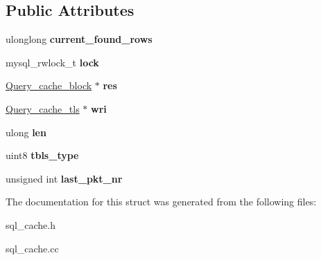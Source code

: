 \subsection*{Public Attributes}
\begin{DoxyCompactItemize}
\item 
\mbox{\label{structQuery__cache__query_a6c683aedb3d1381365d69536689df147}} 
ulonglong {\bfseries current\+\_\+found\+\_\+rows}
\item 
\mbox{\label{structQuery__cache__query_a3b948da400a4e29da917a181747aee06}} 
mysql\+\_\+rwlock\+\_\+t {\bfseries lock}
\item 
\mbox{\label{structQuery__cache__query_a5f3f0884f89ff6b51d9193da473d1cab}} 
\mbox{\hyperlink{structQuery__cache__block}{Query\+\_\+cache\+\_\+block}} $\ast$ {\bfseries res}
\item 
\mbox{\label{structQuery__cache__query_a6f10a18b737c62f1c6799cf8f34adca9}} 
\mbox{\hyperlink{structQuery__cache__tls}{Query\+\_\+cache\+\_\+tls}} $\ast$ {\bfseries wri}
\item 
\mbox{\label{structQuery__cache__query_aef080279902745a3b8e6ce066829c977}} 
ulong {\bfseries len}
\item 
\mbox{\label{structQuery__cache__query_a7c00d4f8b2a7489cc644c2f20faa9245}} 
uint8 {\bfseries tbls\+\_\+type}
\item 
\mbox{\label{structQuery__cache__query_a69da5f4f74cad3184920cb2f796ad75a}} 
unsigned int {\bfseries last\+\_\+pkt\+\_\+nr}
\end{DoxyCompactItemize}


The documentation for this struct was generated from the following files\+:\begin{DoxyCompactItemize}
\item 
sql\+\_\+cache.\+h\item 
sql\+\_\+cache.\+cc\end{DoxyCompactItemize}
